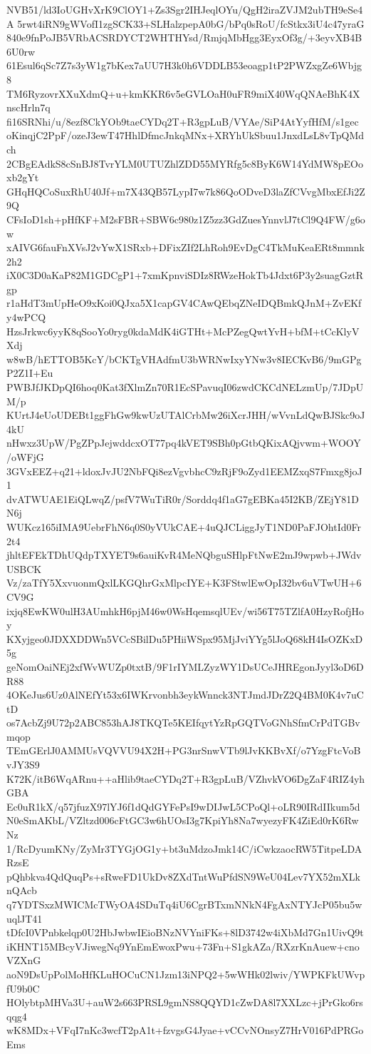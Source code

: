 NVB51/ld3IoUGHvXrK9ClOY1+Zs3Sgr2IHJeqlOYu/QgH2iraZVJM2ubTH9eSe4A
5rwt4iRN9gWVofI1zgSCK33+SLHalzpepA0bG/bPq0sRoU/fcStkx3iU4c47yraG
840e9fnPoJB5VRbACSRDYCT2WHTHYsd/RmjqMbHgg3EyxOf3g/+3eyvXB4B6U0rw
61Esul6qSc7Z7s3yW1g7bKex7aUU7H3k0h6VDDLB53eoagp1tP2PWZxgZe6Wbjg8
TM6RyzovrXXuXdmQ+u+kmKKR6v5eGVLOaH0uFR9miX40WqQNAeBhK4XnscHrln7q
fi16SRNhi/u/8ezf8CkYOb9taeCYDq2T+R3gpLuB/VYAe/SiP4AtYyfHfM/s1gec
oKinqjC2PpF/ozeJ3ewT47HhlDfmcJnkqMNx+XRYhUkSbuu1JnxdLsL8vTpQMdch
2CBgEAdkS8cSnBJ8TvrYLM0UTUZhlZDD55MYRfg5c8ByK6W14YdMW8pEOoxb2gYt
GHqHQCoSuxRhU40Jf+m7X43QB57LypI7w7k86QoODveD3laZfCVvgMbxEfJi2Z9Q
CFsIoD1sh+pHfKF+M2sFBR+SBW6c980z1Z5zz3GdZuesYnnvlJ7tCl9Q4FW/g6ow
xAIVG6fauFnXVsJ2vYwX1SRxb+DFixZIf2LhRoh9EvDgC4TkMuKeaERt8mmnk2h2
iX0C3D0aKaP82M1GDCgP1+7xmKpnviSDIz8RWzeHokTb4Jdxt6P3y2suagGztRgp
r1aHdT3mUpHeO9xKoi0QJxa5X1capGV4CAwQEbqZNeIDQBmkQJnM+ZvEKfy4wPCQ
HzsJrkwc6yyK8qSooYo0ryg0kdaMdK4iGTHt+McPZegQwtYvH+bfM+tCcKlyVXdj
w8wB/hETTOB5KcY/bCKTgVHAdfmU3bWRNwIxyYNw3v8IECKvB6/9mGPgP2Z1I+Eu
PWBJfJKDpQI6hoq0Kat3fXlmZn70R1EcSPavuqI06zwdCKCdNELzmUp/7JDpUM/p
KUrtJ4eUoUDEBt1ggFhGw9kwUzUTAlCrbMw26iXcrJHH/wVvnLdQwBJSkc9oJ4kU
nHwxz3UpW/PgZPpJejwddcxOT77pq4kVET9SBh0pGtbQKixAQjvwm+WOOY/oWFjG
3GVxEEZ+q21+ldoxJvJU2NbFQi8ezVgvbhcC9zRjF9oZyd1EEMZxqS7Fmxg8joJ1
dvATWUAE1EiQLwqZ/psfV7WuTiR0r/Sorddq4f1aG7gEBKa45I2KB/ZEjY81DN6j
WUKcz165iIMA9UebrFhN6q0S0yVUkCAE+4uQJCLiggJyT1ND0PaFJOhtId0Fr2t4
jhltEFEkTDhUQdpTXYET9s6auiKvR4MeNQbguSHlpFtNwE2mJ9wpwb+JWdvUSBCK
Vz/zaTfY5XxvuonmQxlLKGQhrGxMlpcIYE+K3FStwlEwOpI32bv6uVTwUH+6CV9G
ixjq8EwKW0ulH3AUmhkH6pjM46w0WsHqemsqlUEv/wi56T75TZlfA0HzyRofjHoy
KXyjgeo0JDXXDDWn5VCcSBilDu5PHiiWSpx95MjJviYYg5lJoQ68kH4IsOZKxD5g
geNomOaiNEj2xfWvWUZp0txtB/9F1rIYMLZyzWY1DsUCeJHREgonJyyl3oD6DR88
4OKeJus6Uz0AlNEfYt53x6IWKrvonbh3eykWnnck3NTJmdJDrZ2Q4BM0K4v7uCtD
os7AcbZj9U72p2ABC853hAJ8TKQTe5KEIfqytYzRpGQTVoGNhSfmCrPdTGBvmqop
TEmGErlJ0AMMUsVQVVU94X2H+PG3nrSnwVTb9lJvKKBvXf/o7YzgFtcVoBvJY3S9
K72K/itB6WqARnu++aHlib9taeCYDq2T+R3gpLuB/VZhvkVO6DgZaF4RIZ4yhGBA
Ec0uR1kX/q57jfuzX97lYJ6f1dQdGYFePsI9wDIJwL5CPoQl+oLR90IRdIIkum5d
N0eSmAKbL/VZltzd006cFtGC3w6hUOsI3g7KpiYh8Na7wyezyFK4ZiEd0rK6RwNz
1/RcDyumKNy/ZyMr3TYGjOG1y+bt3uMdzoJmk14C/iCwkzaocRW5TitpeLDARzsE
pQhbkva4QdQuqPs+sRweFD1UkDv8ZXdTntWuPfdSN9WeU04Lev7YX52mXLknQAcb
q7YDTSxzMWICMcTWyOA4SDuTq4iU6CgrBTxmNNkN4FgAxNTYJcP05bu5wuqlJT41
tDfcI0VPnbkelqp0U2HbJwbwIEioBNzNVYniFKs+8lD3742w4iXbMd7Gn1UivQ9t
iKHNT15MBcyVJiwegNq9YnEmEwoxPwu+73Fn+S1gkAZa/RXzrKnAuew+cnoVZXnG
aoN9DsUpPolMoHfKLuHOCuCN1Jzm13iNPQ2+5wWHk02lwiv/YWPKFkUWvpfU9b0C
HOlybtpMHVa3U+auW2s663PRSL9gmNS8QQYD1cZwDA8l7XXLzc+jPrGko6rsqqg4
wK8MDx+VFqI7nKc3wcfT2pA1t+fzvgsG4Jyae+vCCvNOnsyZ7HrV016PdPRGoEms
